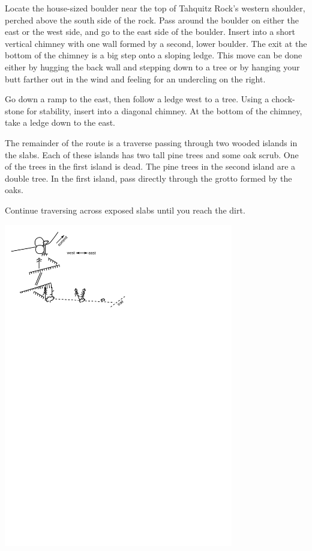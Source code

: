 \documentclass{tahquitz}
\begin{document}
Locate the house-sized boulder near the top of Tahquitz Rock's western shoulder,
perched above the south side of the rock. Pass around the boulder on either the
east or the west side, and go to the east side of the boulder. Insert into a short vertical chimney
with one wall formed by a second, lower boulder. The exit at the bottom of the chimney is a big step
onto a sloping ledge. This move can be done either by hugging the back wall and stepping down to
a tree or by hanging your butt farther out in the wind and feeling for an undercling on the right.

Go down a ramp to the east, then follow a ledge west to a tree. Using a chock-stone for
stability, insert into a diagonal chimney. At the bottom of the chimney, take a ledge down to
the east.

The remainder of the route is a traverse passing through 
two wooded islands in the slabs. Each of these islands has two tall pine trees and some oak scrub.
One of the trees in the first island is dead. The pine trees in the second island are a double tree.
In the first island, pass directly through the grotto formed by the oaks.

Continue traversing across exposed slabs until you reach the dirt.

\includegraphics[width=100mm]{figs/friction_descent}
\end{document}
